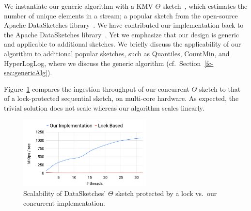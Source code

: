 We instantiate our generic algorithm with a KMV $\Theta$ sketch~\cite{KMV},
which estimates the number of unique elements in a stream; a popular sketch
from the open-source Apache DataSketches library~\cite{DataSketches}.
We have contributed our implementation back to the Apache DataSketches 
library~\cite{ConcurrentThetaImp}. 
Yet we emphasize that our design is generic and applicable to additional sketches. 
We briefly discuss the applicability of our algorithm to additional popular sketches, such as Quantiles, CountMin, and HyperLogLog, 
where we discuss the generic algorithm (cf.~Section~\ref{fc-sec:genericAlg}).

Figure~\ref{fc-fig:performance} compares
the ingestion throughput of our concurrent $\Theta$ sketch to that of a lock-protected sequential sketch,
on multi-core hardware. As expected, the trivial solution does not scale whereas our algorithm scales linearly. 


\begin{figure}[htb]
  \begin{center}
    \includegraphics[width=0.6\textwidth]{graphics/fast-concurrent/concurrentThetaGraph.png}
  \end{center}
  \caption{Scalability of DataSketches' $\Theta$ sketch 
   protected by a lock vs.\ our concurrent implementation.}
  \label{fc-fig:performance}
\end{figure}

